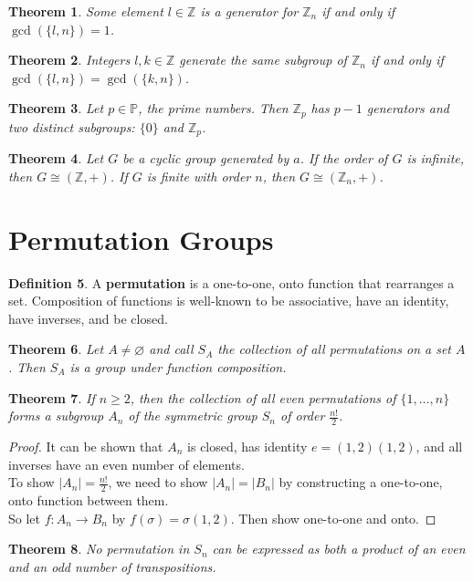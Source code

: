 \documentclass[11pt]{amsart}
\newtheorem{theorem}{Theorem}[section]
\theoremstyle{definition}
\newtheorem{definition}[theorem]{Definition}
\newcommand{\integers}{\mathbb{Z}}
\newcommand{\primes}{\mathbb{P}}
\let\emptyset\varnothing
\begin{document}
\begin{theorem}
	Some element $l \in \integers$ is a generator for $\integers_n$ if and only if $\gcd(\{ l, n \}) = 1$.
\end{theorem}
\begin{theorem}
	Integers $l, k \in \integers$ generate the same subgroup of $\integers_n$ if and only if $\gcd(\{ l, n \}) = \gcd(\{ k, n \})$.
\end{theorem}
\begin{theorem}
	Let $p \in \primes$, the prime numbers. Then $\integers_p$ has $p - 1$ generators and two distinct subgroups: $\{ 0 \}$ and 
	$\integers_p$.
\end{theorem}
\begin{theorem}
	Let $G$ be a cyclic group generated by $a$. If the order of $G$ is infinite, then $G \cong (\integers, +)$. If $G$ is finite with 
	order $n$, then $G \cong (\integers_n, +)$.
\end{theorem}

\section{Permutation Groups}
\begin{definition}
	A \textbf{permutation} is a one-to-one, onto function that rearranges a set. Composition of functions is well-known to be
	associative, have an identity, have inverses, and be closed.
\end{definition}
\begin{theorem}
	Let $A \neq \emptyset$ and call $S_A$ the collection of all permutations on a set $A$. Then $S_A$ is a group under 
	function composition.
\end{theorem}
\begin{theorem}
	If $n \geq 2$, then the collection of all even permutations of $\{ 1, \dots, n \}$ forms a subgroup $A_n$ of the symmetric group
	$S_n$ of order $\frac{n!}{2}$.
\end{theorem}
\begin{proof}
	It can be shown that $A_n$ is closed, has identity $e = (1,2)(1,2)$, and all inverses have an even number of elements. \\
	To show $| A_n | = \frac{n!}{2}$, we need to show $| A_n | = | B_n |$ by constructing a one-to-one, onto function between them. \\
	So let $f: A_n \to B_n$ by $f(\sigma) = \sigma(1,2)$. Then show one-to-one and onto.
\end{proof}
\begin{theorem}
	No permutation in $S_n$ can be expressed as both a product of an even and an odd number of transpositions.
\end{theorem}
\end{document}
